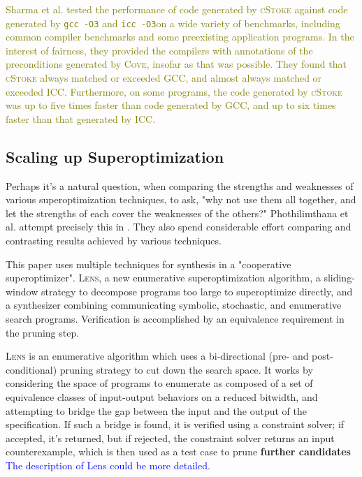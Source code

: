 \documentclass[12pt,twoside]{reedthesis}
\newcommand{\green}[1]{\textcolor{olive}{#1}}
\newcommand{\comment}[2]{\textbf{#1} \textcolor{blue}{#2}}
\begin{document}
        
        \green{
        Sharma et al. tested the performance of code generated by \textsc{cStoke} against code generated by \texttt{gcc -O3} and \texttt{icc -O3}\footnotemark on a wide variety of benchmarks, including common compiler benchmarks and some preexisting application programs.
        In the interest of fairness, they provided the compilers with annotations of the preconditions generated by \textsc{Cove}, insofar as that was possible.
        They found that \textsc{cStoke} always matched or exceeded GCC, and almost always matched or exceeded ICC.
        Furthermore, on some programs, the code generated by \textsc{cStoke} was up to five times faster than code generated by GCC, and up to six times faster than that generated by ICC.
        }
        

    \subsection{Scaling up Superoptimization}
        Perhaps it's a natural question, when comparing the strengths and weaknesses of various superoptimization techniques, to ask, "why not use them all together, and let the strengths of each cover the weaknesses of the others?"
        Phothilimthana et al. attempt precisely this in \cite{phothilimthana2016scaling}.
        They also spend considerable effort comparing and contrasting results achieved by various techniques.
        
        This paper uses multiple techniques for synthesis in a "cooperative superoptimizer".
        \textsc{Lens}, a new enumerative superoptimization algorithm,
        a sliding-window strategy to decompose programs too large to superoptimize directly,
        and a synthesizer combining communicating symbolic, stochastic, and enumerative search programs.
        Verification is accomplished by an equivalence requirement in the pruning step.
        
        \textsc{Lens} is an enumerative algorithm which uses a bi-directional (pre- and post-conditional) pruning strategy to cut down the search space.
        It works by considering the space of programs to enumerate as composed of a set of equivalence classes of input-output behaviors on a reduced bitwidth, and attempting to bridge the gap between the input and the output of the specification.
        If such a bridge is found, it is verified using a constraint solver;
                if accepted, it's returned,
                but if rejected, the constraint solver returns an input counterexample,
            which is then used as a test case to prune \comment{further candidates}{The description of Lens could be more detailed}.
        
\end{document}
